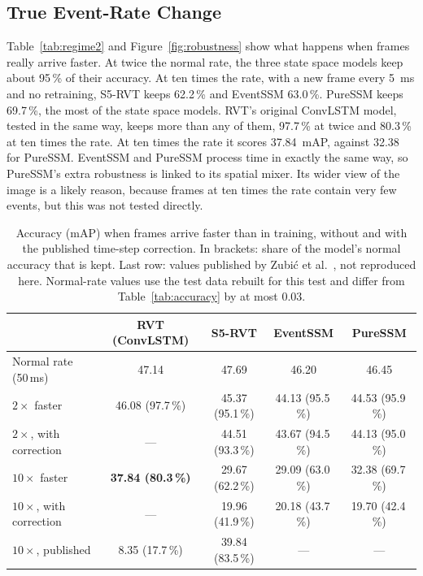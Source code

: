 \documentclass[11pt, a4paper]{report}
\begin{document}
\subsection{True Event-Rate Change}
Table~\ref{tab:regime2} and Figure~\ref{fig:robustness} show what happens when frames really arrive faster.
At twice the normal rate, the three state space models keep about 95\,\% of their accuracy. At ten times the
rate, with a new frame every 5~ms and no retraining, S5-RVT keeps 62.2\,\% and EventSSM 63.0\,\%. PureSSM
keeps 69.7\,\%, the most of the state space models. RVT's original ConvLSTM model, tested in the same way,
keeps more than any of them, 97.7\,\% at twice and 80.3\,\% at ten times the rate. At ten times the rate it
scores 37.84~mAP, against 32.38 for PureSSM.  EventSSM and PureSSM process time in exactly
the same way, so PureSSM's extra robustness is linked to its spatial mixer. Its wider view of the image is a
likely reason, because frames at ten times the rate contain very few events, but this was not tested
directly.

\begin{table}[htbp]
\centering
\caption[Accuracy when frames arrive faster]{Accuracy (mAP) when frames arrive faster than in training, without and with the
    published time-step correction. In brackets: share of the model's normal accuracy that is kept. Last row:
    values published by Zubi\'{c} et al.~\cite{zubic2024state}, not reproduced here. Normal-rate values use the test data
    rebuilt for this test and differ from Table~\ref{tab:accuracy} by at most 0.03.}
\label{tab:regime2}
\label{tab:dt_comp}
\small
\begin{tabular}{lcccc}
\toprule
 & \textbf{RVT (ConvLSTM)} & \textbf{S5-RVT} & \textbf{EventSSM} & \textbf{PureSSM} \\
\midrule
Normal rate (50\,ms)             & 47.14 & 47.69 & 46.20 & 46.45 \\
$2\times$ faster                 & 46.08 (97.7\,\%) & 45.37 (95.1\,\%) & 44.13 (95.5\,\%) & 44.53 (95.9\,\%) \\
$2\times$, with correction       & --- & 44.51 (93.3\,\%) & 43.67 (94.5\,\%) & 44.13 (95.0\,\%) \\
$10\times$ faster                & \textbf{37.84 (80.3\,\%)} & 29.67 (62.2\,\%) & 29.09 (63.0\,\%) & 32.38 (69.7\,\%) \\
$10\times$, with correction      & --- & 19.96 (41.9\,\%) & 20.18 (43.7\,\%) & 19.70 (42.4\,\%) \\
\midrule
$10\times$, published            & 8.35 (17.7\,\%) & 39.84 (83.5\,\%) & --- & --- \\
\bottomrule
\end{tabular}
\end{table}
\end{document}
